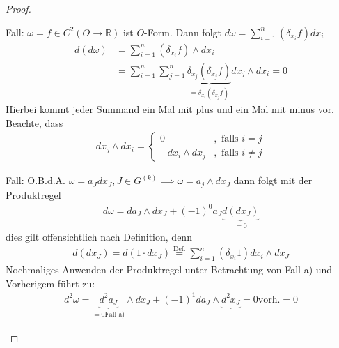 \begin{theorem}[Satz]
\begin{proof}
\begin{enum-arab}
    \item 
      \begin{enum-alph}
      \item Fall: $\omega=f\in C^2(O\to \mathbb{R})$ ist $O$-Form. Dann folgt $d\omega=\sum_{i=1}^n (\delta_{x_i} f)dx_i$
        \begin{align*}
          d(d\omega)&=\sum_{i=1}^n (\delta_{x_i} f)\wedge dx_i\\
          &= \sum_{i=1}^n \sum_{j=1}^n \underbrace{\delta_{x_j}(\delta_{x_j}f)}_{=\delta_{x_i}(\delta_{x_j} f)} dx_j  \wedge dx_i = 0
        \end{align*}
        Hierbei kommt jeder Summand ein Mal mit plus und ein Mal mit minus vor. Beachte, dass
        \begin{align*}
          dx_j\wedge dx_i=\begin{cases} 0 &, \text{ falls } i=j\\ -dx_i\wedge dx_j &,\text{ falls } i\neq j\end{cases}
        \end{align*}
      \item Fall: O.B.d.A. $\omega=a_J dx_J, J \in G^{(k)} \implies \omega=a_j\wedge dx_J$
        dann folgt mit der Produktregel
        \begin{align*}
          d\omega=da_J \wedge dx_J+(-1)^0 a_J \underbrace{d(dx_J)}_{=0}
        \end{align*}
        dies gilt offensichtlich nach Definition, denn
        \begin{align*}
          d(dx_J)=d(1\cdot dx_J)\stackrel{\text{Def.}}=\sum_{i=1}^n(\delta_{x_i} 1) dx_i \wedge dx_J
        \end{align*}
        Nochmaliges Anwenden der Produktregel unter Betrachtung von Fall a) und Vorherigem führt zu:
        \begin{align*}
          d^2\omega=\underbrace{d^2 a_J}_{=0 \text{Fall a)}} \wedge dx_J+(-1)^1 da_J \wedge \underbrace{d^2x_J}{=0 \text{vorh.}}=0
        \end{align*}
      \end{enum-alph}
    \end{enum-arab}
  \end{proof}
\end{theorem}


